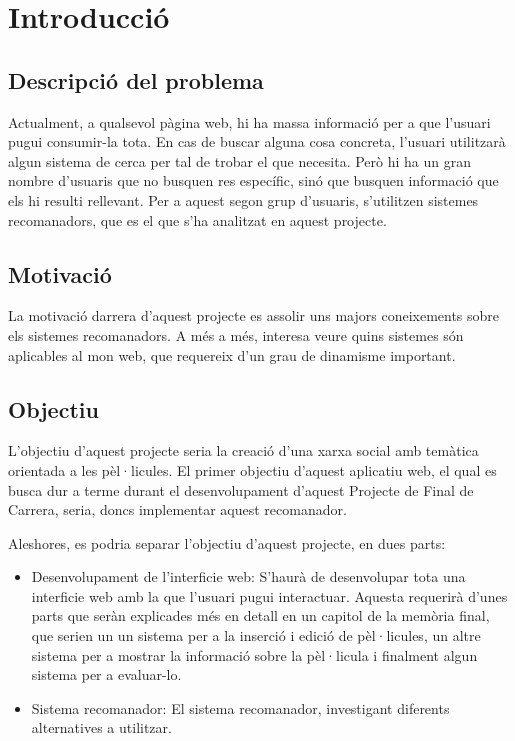 \chapter{Introducció}
\section{Descripció del problema}

Actualment, a qualsevol pàgina web, hi ha massa informació per a que l'usuari pugui consumir-la tota. En cas de buscar alguna cosa concreta, l'usuari utilitzarà algun sistema de cerca per tal de trobar el que necesita. Però hi ha un gran nombre d'usuaris que no busquen res específic, sinó que busquen informació que els hi resulti rellevant. Per a aquest segon grup d'usuaris, s'utilitzen sistemes recomanadors, que es el que s'ha analitzat en aquest projecte.

\section{Motivació}

La motivació darrera d'aquest projecte es assolir uns majors coneixements sobre els sistemes recomanadors. A més a més, interesa veure quins sistemes són aplicables al mon web, que requereix d'un grau de dinamisme important.

\section{Objectiu}

L'objectiu d'aquest projecte seria la creació d'una xarxa social amb temàtica orientada a les pèl·licules. El primer objectiu d'aquest aplicatiu web, el qual es busca dur a terme durant el desenvolupament d'aquest Projecte de Final de Carrera, seria, doncs implementar aquest recomanador.

Aleshores, es podria separar l'objectiu d'aquest projecte, en dues parts:

\begin{itemize}
\item Desenvolupament de l'interficie web: S'haurà de desenvolupar tota una interficie web amb la que l'usuari pugui interactuar. Aquesta requerirà d'unes parts que seràn explicades més en detall en un capitol de la memòria final, que serien un un sistema per a la inserció i edició de pèl·licules, un altre sistema per a mostrar la informació sobre la pèl·licula i finalment algun sistema per a evaluar-lo.
\item Sistema recomanador: El sistema recomanador, investigant diferents alternatives a utilitzar.
\end{itemize}

